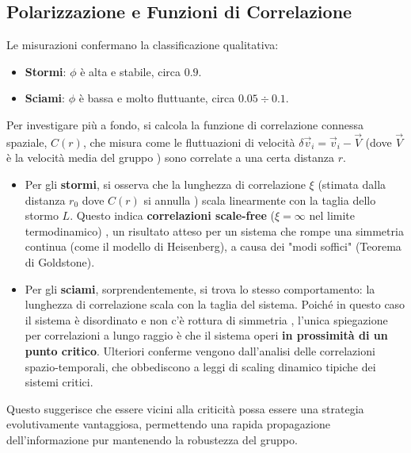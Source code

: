 \subsection{Polarizzazione e Funzioni di Correlazione}
Le misurazioni confermano la classificazione qualitativa:
\begin{itemize}
    \item \textbf{Stormi}: $\phi$ è alta e stabile, circa $0.9$.
    \item \textbf{Sciami}: $\phi$ è bassa e molto fluttuante, circa $0.05 \div 0.1$.
\end{itemize}
Per investigare più a fondo, si calcola la funzione di correlazione connessa spaziale, $C(r)$, che misura come le fluttuazioni di velocità $\delta\vec{v}_i = \vec{v}_i - \vec{V}$ (dove $\vec{V}$ è la velocità media del gruppo ) sono correlate a una certa distanza $r$.
\begin{itemize}
    \item Per gli \textbf{stormi}, si osserva che la lunghezza di correlazione $\xi$ (stimata dalla distanza $r_0$ dove $C(r)$ si annulla ) scala linearmente con la taglia dello stormo $L$. Questo indica \textbf{correlazioni scale-free} ($\xi = \infty$ nel limite termodinamico) , un risultato atteso per un sistema che rompe una simmetria continua (come il modello di Heisenberg), a causa dei "modi soffici" (Teorema di Goldstone).
    \item Per gli \textbf{sciami}, sorprendentemente, si trova lo stesso comportamento: la lunghezza di correlazione scala con la taglia del sistema. Poiché in questo caso il sistema è disordinato e non c'è rottura di simmetria , l'unica spiegazione per correlazioni a lungo raggio è che il sistema operi \textbf{in prossimità di un punto critico}. Ulteriori conferme vengono dall'analisi delle correlazioni spazio-temporali, che obbediscono a leggi di scaling dinamico tipiche dei sistemi critici.
\end{itemize}
Questo suggerisce che essere vicini alla criticità possa essere una strategia evolutivamente vantaggiosa, permettendo una rapida propagazione dell'informazione pur mantenendo la robustezza del gruppo.

